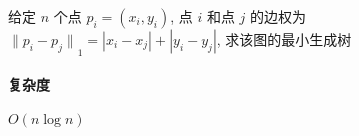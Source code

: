 给定 \(n\) 个点 \(p_i=(x_i,y_i)\), 点 \(i\) 和点 \(j\) 的边权为 \({\lVert p_i-p_j\rVert}_1=|x_i-x_j|+|y_i-y_j|\), 求该图的最小生成树

\paragraph{复杂度}

\(O(n\log n)\)
